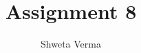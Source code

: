 \documentclass[journal,12pt,twocolumn]{IEEEtran}
\begin{document}
\makeatletter
{}
\makeatother
\let\StandardTheFigure\thefigure
\let\vec\mathbf
\renewcommand{\thefigure}{\theproblem}
\def\putbox#1#2#3{\makebox[0in][l]{\makebox[#1][l]{}\raisebox{\baselineskip}[0in][0in]{\raisebox{#2}[0in][0in]{#3}}}}
     \def\rightbox#1{\makebox[0in][r]{#1}}
     \def\centbox#1{\makebox[0in]{#1}}
     \def\topbox#1{\raisebox{-\baselineskip}[0in][0in]{#1}}
     \def\midbox#1{\raisebox{-0.5\baselineskip}[0in][0in]{#1}}
\vspace{3cm}
\title{Assignment 8}
\author{Shweta Verma}
%
%
%
% 
%
\end{document}
